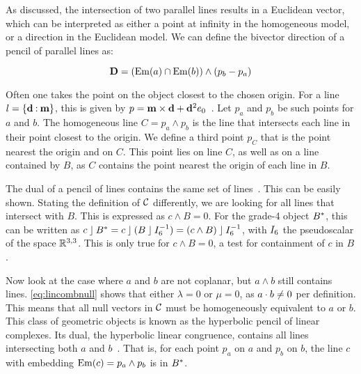 As discussed, the intersection of two parallel lines results in a Euclidean vector, which can be interpreted as either a point at infinity in the homogeneous model, or a direction in the Euclidean model.  We can define the bivector direction of a pencil of parallel lines as:

\begin{equation*}
  \mathbf{D} = \left(\operatorname{Em}(a) \cap \operatorname{Em}(b)\right) \wedge \left(p_b - p_a\right)
\end{equation*}

Often one takes the point on the object closest to the chosen origin.  For a line $l = \{\mathbf{d} \mathbin{:} \mathbf{m}\}$, this is given by $p = \mathbf{m} \times \mathbf{d} + \mathbf{d}^2 e_0$~\cite{Shoemake}.  Let $p_a$ and $p_b$ be such points for $a$ and $b$.  The homogeneous line $C = p_a \wedge p_b$ is the line that intersects each line in their point closest to the origin.  We define a third point $p_C$ that is the point nearest the origin and on $C$.  This point lies on line $C$, as well as on a line contained by $B$, as $C$ contains the point nearest the origin of each line in $B$.

The dual of a pencil of lines contains the same set of lines~\cite[Section 3.2.1]{Pottmann}.  This can be easily shown.  Stating the definition of $\mathcal{C}$ differently, we are looking for all lines that intersect with $B$.  This is expressed as $c \wedge B = 0$.  For the grade-4 object $B^\ast$, this can be written as $c \mathbin{\rfloor} B^\ast = c \mathbin{\rfloor} (B \mathbin{\rfloor} I_6^{-1}) = (c \wedge B) \mathbin{\rfloor} I_6^{-1}$, with $I_6$ the pseudoscalar of the space $\mathbb{R}^{3,3}$.  This is only true for $c \wedge B = 0$, a test for containment of $c$ in $B$.


Now look at the case where $a$ and $b$ are not coplanar, but $a \wedge b$ still contains lines.  \autoref{eq:lincombnull} shows that either $\lambda = 0$ or $\mu = 0$, as $a \mathbin{\cdot} b \not= 0$ per definition.  This means that all null vectors in $\mathcal{C}$ must be homogeneously equivalent to $a$ or $b$.  This class of geometric objects is known as the hyperbolic pencil of linear complexes.  Its dual, the hyperbolic linear congruence, contains all lines intersecting both $a$ and $b$~\cite[Proposition 3.2.3]{Pottmann}. That is, for each point $p_a$ on $a$ and $p_b$ on $b$, the line $c$ with embedding $\operatorname{Em}(c) = p_a \wedge p_b$ is in $B^\ast$.  

